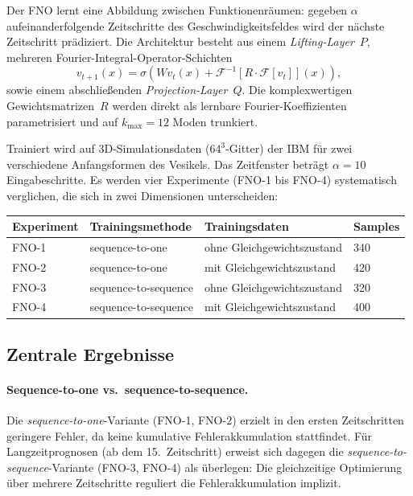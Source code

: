 \documentclass[a4paper,12pt]{article}
\begin{document}
Der FNO lernt eine Abbildung zwischen Funktionenräumen: gegeben $\alpha$ aufeinanderfolgende Zeitschritte des Geschwindigkeitsfeldes wird der nächste
Zeitschritt prädiziert. Die Architektur besteht aus einem
\emph{Lifting-Layer}~$P$, mehreren Fourier-Integral-Operator-Schichten
\begin{equation}
    v_{t+1}(x) = \sigma\!\left(W v_t(x)
    + \mathcal{F}^{-1}\!\left[R \cdot \mathcal{F}[v_t]\right](x)\right),
\end{equation}
sowie einem abschließenden \emph{Projection-Layer}~$Q$.  Die komplexwertigen
Gewichtsmatrizen~$R$ werden direkt als lernbare Fourier-Koeffizienten
parametrisiert und auf $k_{\max} = 12$ Moden trunkiert.

Trainiert wird auf 3D-Simulationsdaten ($64^3$-Gitter) der IBM für zwei
verschiedene Anfangsformen des Vesikels.  Das Zeitfenster beträgt $\alpha = 10$
Eingabeschritte.  Es werden vier Experimente (FNO-1 bis FNO-4) systematisch
verglichen, die sich in zwei Dimensionen unterscheiden:

\begin{center}
\begin{tabular}{llll}
\toprule
Experiment & Trainingsmethode & Trainingsdaten & Samples \\
\midrule
FNO-1 & sequence-to-one   & ohne Gleichgewichtszustand & 340 \\
FNO-2 & sequence-to-one   & mit Gleichgewichtszustand  & 420 \\
FNO-3 & sequence-to-sequence & ohne Gleichgewichtszustand & 320 \\
FNO-4 & sequence-to-sequence & mit Gleichgewichtszustand  & 400 \\
\bottomrule
\end{tabular}
\end{center}

\subsection*{Zentrale Ergebnisse}

\paragraph{Sequence-to-one vs.\ sequence-to-sequence.}
Die \emph{sequence-to-one}-Variante (FNO-1, FNO-2) erzielt in den ersten
Zeitschritten geringere Fehler, da keine kumulative Fehlerakkumulation stattfindet. Für Langzeitprognosen (ab dem 15.\ Zeitschritt) erweist sich dagegen
die \emph{sequence-to-sequence}-Variante (FNO-3, FNO-4) als überlegen: Die
gleichzeitige Optimierung über mehrere Zeitschritte reguliert die
Fehlerakkumulation implizit.
\end{document}
